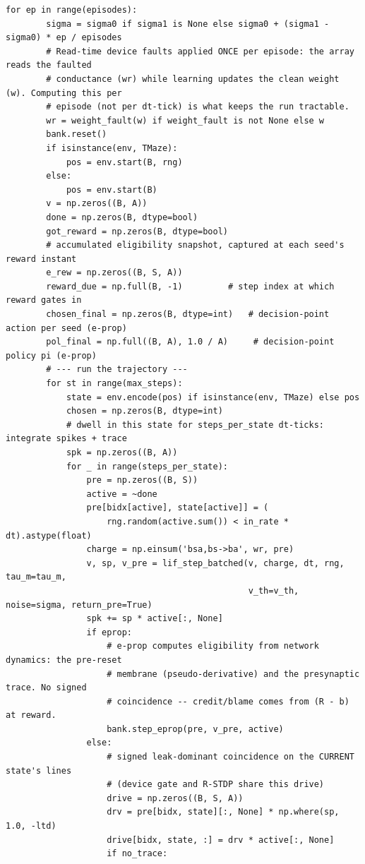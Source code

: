 \begin{lstlisting}[caption={mrl\_trace/maze.py},label={lst:siox-src-maze}]
    for ep in range(episodes):
        sigma = sigma0 if sigma1 is None else sigma0 + (sigma1 - sigma0) * ep / episodes
        # Read-time device faults applied ONCE per episode: the array reads the faulted
        # conductance (wr) while learning updates the clean weight (w). Computing this per
        # episode (not per dt-tick) is what keeps the run tractable.
        wr = weight_fault(w) if weight_fault is not None else w
        bank.reset()
        if isinstance(env, TMaze):
            pos = env.start(B, rng)
        else:
            pos = env.start(B)
        v = np.zeros((B, A))
        done = np.zeros(B, dtype=bool)
        got_reward = np.zeros(B, dtype=bool)
        # accumulated eligibility snapshot, captured at each seed's reward instant
        e_rew = np.zeros((B, S, A))
        reward_due = np.full(B, -1)         # step index at which reward gates in
        chosen_final = np.zeros(B, dtype=int)   # decision-point action per seed (e-prop)
        pol_final = np.full((B, A), 1.0 / A)     # decision-point policy pi (e-prop)
        # --- run the trajectory ---
        for st in range(max_steps):
            state = env.encode(pos) if isinstance(env, TMaze) else pos
            chosen = np.zeros(B, dtype=int)
            # dwell in this state for steps_per_state dt-ticks: integrate spikes + trace
            spk = np.zeros((B, A))
            for _ in range(steps_per_state):
                pre = np.zeros((B, S))
                active = ~done
                pre[bidx[active], state[active]] = (
                    rng.random(active.sum()) < in_rate * dt).astype(float)
                charge = np.einsum('bsa,bs->ba', wr, pre)
                v, sp, v_pre = lif_step_batched(v, charge, dt, rng, tau_m=tau_m,
                                                v_th=v_th, noise=sigma, return_pre=True)
                spk += sp * active[:, None]
                if eprop:
                    # e-prop computes eligibility from network dynamics: the pre-reset
                    # membrane (pseudo-derivative) and the presynaptic trace. No signed
                    # coincidence -- credit/blame comes from (R - b) at reward.
                    bank.step_eprop(pre, v_pre, active)
                else:
                    # signed leak-dominant coincidence on the CURRENT state's lines
                    # (device gate and R-STDP share this drive)
                    drive = np.zeros((B, S, A))
                    drv = pre[bidx, state][:, None] * np.where(sp, 1.0, -ltd)
                    drive[bidx, state, :] = drv * active[:, None]
                    if no_trace:

\end{lstlisting}

